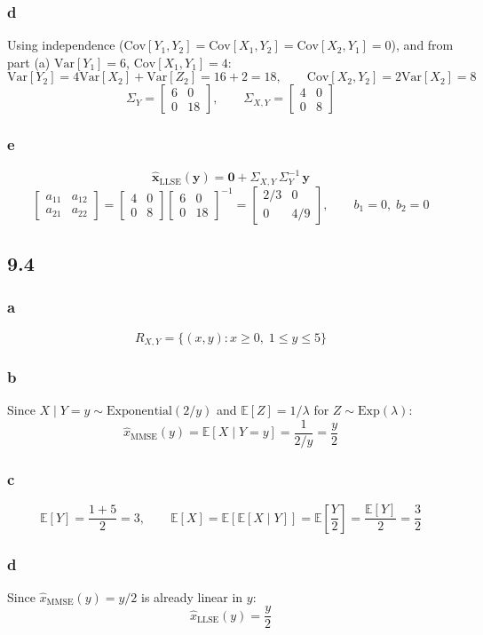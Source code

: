 \documentclass{article}
\newcommand{\mat}[1]{\begin{bmatrix}#1\end{bmatrix}}
\newcommand{\E}[1]{\mathbb{E}\!\left[#1\right]}
\newcommand{\Var}[1]{\mathrm{Var}\!\left[#1\right]}
\newcommand{\Cov}[2]{\mathrm{Cov}\!\left[#1,#2\right]}
\begin{document}
\subsubsection*{d}
Using independence ($\Cov{Y_1}{Y_2} = \Cov{X_1}{Y_2} = \Cov{X_2}{Y_1} = 0$), and from part (a) $\Var{Y_1}=6$, $\Cov{X_1}{Y_1}=4$:
\[
\Var{Y_2} = 4\Var{X_2} + \Var{Z_2} = 16 + 2 = 18,\qquad
\Cov{X_2}{Y_2} = 2\Var{X_2} = 8
\]
\[
\Sigma_Y = \mat{6 & 0 \\ 0 & 18},\qquad
\Sigma_{X,Y} = \mat{4 & 0 \\ 0 & 8}
\]

\subsubsection*{e}
\[
\hat{\mathbf{x}}_\text{LLSE}(\mathbf{y}) = \mathbf{0} + \Sigma_{X,Y}\,\Sigma_Y^{-1}\,\mathbf{y}
\]
\[
\mat{a_{11} & a_{12} \\ a_{21} & a_{22}}
= \mat{4 & 0 \\ 0 & 8}\mat{6 & 0 \\ 0 & 18}^{-1}
= \mat{2/3 & 0 \\ 0 & 4/9},\qquad
b_1 = 0,\; b_2 = 0
\]

\subsection*{9.4}

\subsubsection*{a}
\[
R_{X,Y} = \{(x,y) : x \geq 0,\; 1 \leq y \leq 5\}
\]

\subsubsection*{b}
Since $X \mid Y=y \sim \mathrm{Exponential}(2/y)$ and $\E{Z}=1/\lambda$ for $Z\sim\mathrm{Exp}(\lambda)$:
\[
\hat{x}_\text{MMSE}(y) = \E{X \mid Y=y} = \frac{1}{2/y} = \frac{y}{2}
\]

\subsubsection*{c}
\[
\E{Y} = \frac{1+5}{2} = 3,\qquad
\E{X} = \E{\E{X\mid Y}} = \E{\frac{Y}{2}} = \frac{\E{Y}}{2} = \frac{3}{2}
\]

\subsubsection*{d}
Since $\hat{x}_\text{MMSE}(y) = y/2$ is already linear in $y$:
\[
\hat{x}_\text{LLSE}(y) = \frac{y}{2}
\]
\end{document}
